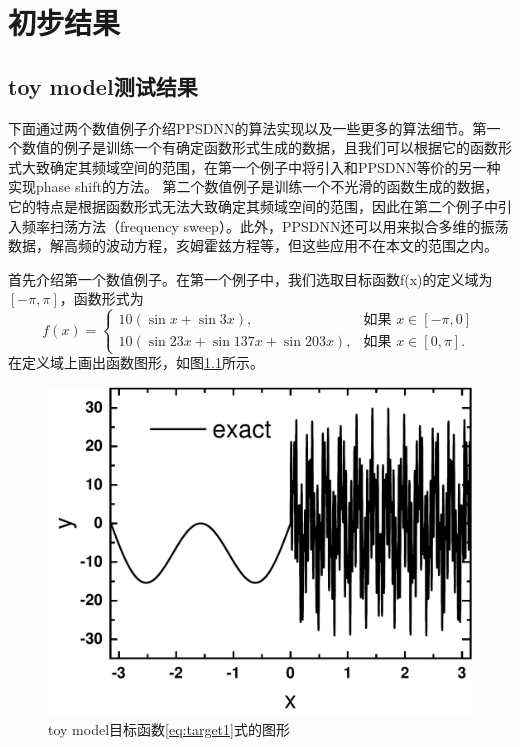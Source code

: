 \chapter[初步结果]{初步结果}
\label{chap3}
\section{toy model测试结果}
下面通过两个数值例子介绍PPSDNN的算法实现以及一些更多的算法细节。第一个数值的例子是训练一个有确定函数形式生成的数据，且我们可以根据它的函数形式大致确定其频域空间的范围，在第一个例子中将引入和PPSDNN等价的另一种实现phase shift的方法。
第二个数值例子是训练一个不光滑的函数生成的数据，它的特点是根据函数形式无法大致确定其频域空间的范围，因此在第二个例子中引入频率扫荡方法（frequency sweep）。此外，PPSDNN还可以用来拟合多维的振荡数据，解高频的波动方程，亥姆霍兹方程等，但这些应用不在本文的范围之内。

首先介绍第一个数值例子。在第一个例子中，我们选取目标函数f(x)的定义域为$[-\pi,\pi]$，函数形式为
\begin{equation}\label{eq:target1}
    f(x) = \begin{cases}
             10(\sin x + \sin 3x), & \mbox{如果 } x\in [-\pi,0] \\
             10(\sin 23x + \sin 137x + \sin 203x), & \mbox{如果 }x\in [0,\pi].
           \end{cases}
  \end{equation}
在定义域上画出函数图形，如图\ref{toy}所示。
\begin{figure}[htbp]
  \centering
  \includegraphics[width=0.76\linewidth]{figures/toymodel/exact.pdf}
  \caption{toy model目标函数\ref{eq:target1}式的图形}
  \label{toy}
\end{figure}

